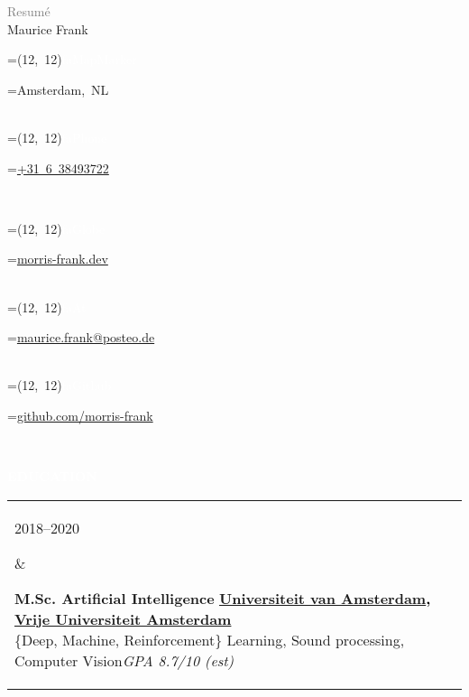 \documentclass{article}
\newcommand{\vcenteredhbox}[1]{%
	\begingroup%
		\setbox0=\hbox{#1}\parbox{\wd0}{\box0}%
	\endgroup%
}
\newcommand{\icon}[3]{%
	\vcenteredhbox{\colorbox{primary}{\makebox(#2, #2){\textcolor{white}{\large\csname fa#1\endcsname}}}}%
	\hspace{0.2cm}%
	\vcenteredhbox{\textcolor{primary}{#3}}%
}
\newcommand{\cvsect}[1]{
	\vspace{0.5\baselineskip}
	\colorbox{primary}{\textcolor{white}{\MakeUppercase{\textbf{#1}}}}\\
}
\newenvironment{entrylist}{
	\begin{longtable}[H]{l l}
}{
	\end{longtable}
}
\newcommand{\entry}[4]{%
	\parbox[t]{0.175\linewidth}{#1} &
	\parbox[t]{0.825\linewidth}{
		\textbf{#2}%
		\hfill%
		{\footnotesize \textbf{\textcolor{black}{#3}}}\\%
		{\small #4} %
    }\\\\}
\begin{document}
\begin{minipage}[t]{0.4\textwidth}
    \vspace{-\baselineskip}
    {\LARGE\textcolor{gray}{Resumé}}\\

    {\Huge Maurice Frank}
\end{minipage}
\begin{cvbox}
	\icon{MapMarker}{12}{Amsterdam, NL}\\
	\icon{Phone}{12}{\href{tel:0031638493722}{+31 6 38493722}}\\
\end{cvbox}
\begin{cvbox}
	\icon{Globe}{12}{\href{https://morris-frank.dev}{morris-frank.dev}}\\
    \icon{At}{12}{\href{mailto:maurice.frank@posteo.de}{maurice.frank@posteo.de}}\\
	\icon{Github}{12}{\href{https://github.com/morris-frank}{github.com/morris-frank}}\\
\end{cvbox}

\cvsect{Education}
\begin{entrylist}
    \entry{2018--2020}
    {M.Sc. Artificial Intelligence}
    {\href{https://uva.nl}{Universiteit van Amsterdam}, \href{https://vu.nl}{Vrije Universiteit Amsterdam}}
    {\{Deep, Machine, Reinforcement\} Learning, Sound processing, Computer Vision\hfill\textit{GPA 8.7/10 \scriptsize{(est)}}}

    \entry{2014--2017}
    {B.Sc. Applied Computer Science}
    {\href{https://www.uni-heidelberg.de/en}{University Heidelberg}}
    {\textit{Focus}: Image processing and pattern recognition\hfill\textit{GPA 3.48/4}}

    \entry{2013--2014}
    {B.Sc. Physics}
    {\href{https://www.uni-heidelberg.de/en}{University Heidelberg}}
    {Change of degree after the second semester, kept as minor studies}

\end{entrylist}
\end{document}
